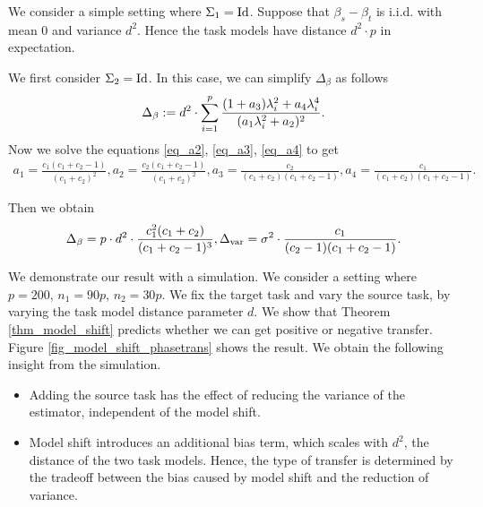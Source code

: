 \begin{example}
	We consider a simple setting where $\Sigma_1 = \operatorname{Id}$.
	Suppose that $\beta_s - \beta_t$ is i.i.d. with mean $0$ and variance $d^2$. Hence the task models have distance $d^2\cdot p$ in expectation.


	We first consider $\Sigma_2 = \operatorname{Id}$. In this case, we can simplify $\Delta_{\beta}$ as follows
	\begin{align} \label{eq_delta_simple}
		\Delta_{\beta} := d^2 \cdot \sum_{i=1}^p \frac{(1 + a_3)\lambda_i^2 + a_4 \lambda_i^4}{(a_1 \lambda_i^2 + a_2)^2}.
	\end{align}
	Now we solve the equations \eqref{eq_a2}, \eqref{eq_a3}, \eqref{eq_a4} to get
	\begin{align}
		a_1 = \frac{c_1(c_1 + c_2 - 1)}{(c_1 + c_2)^2},
		a_2 = \frac{c_2(c_1 + c_2 - 1)}{(c_1 + c_2)^2},
		a_3 = \frac{c_2}{(c_1 + c_2)(c_1 + c_2 - 1)},
		a_4 = \frac{c_1}{(c_1 + c_2)(c_1 + c_2 - 1)}.
	\end{align}

	Then we obtain
	\begin{align}
		\Delta_{\beta} = p \cdot d^2 \cdot \frac{c_1^2 (c_1 + c_2)}{(c_1 + c_2 - 1)^3},
		\Delta_{\text{var}} = \sigma^2 \cdot \frac{c_1}{(c_2 - 1)(c_1 + c_2 - 1)}.
	\end{align}

	We demonstrate our result with a simulation.
	We consider a setting where $p = 200$, $n_1 = 90p$, $n_2 = 30p$.
	We fix the target task and vary the source task, by varying the task model distance parameter $d$.
	We show that Theorem \ref{thm_model_shift} predicts whether we can get positive or negative transfer.
	Figure \ref{fig_model_shift_phasetrans} shows the result.
	We obtain the following insight from the simulation.
	\begin{itemize}
		\item Adding the source task has the effect of reducing the variance of the estimator, independent of the model shift.
		\item Model shift introduces an additional bias term, which scales with $d^2$, the distance of the two task models.
		Hence, the type of transfer is determined by the tradeoff between the bias caused by model shift and the reduction of variance.
	\end{itemize}
\end{example}

